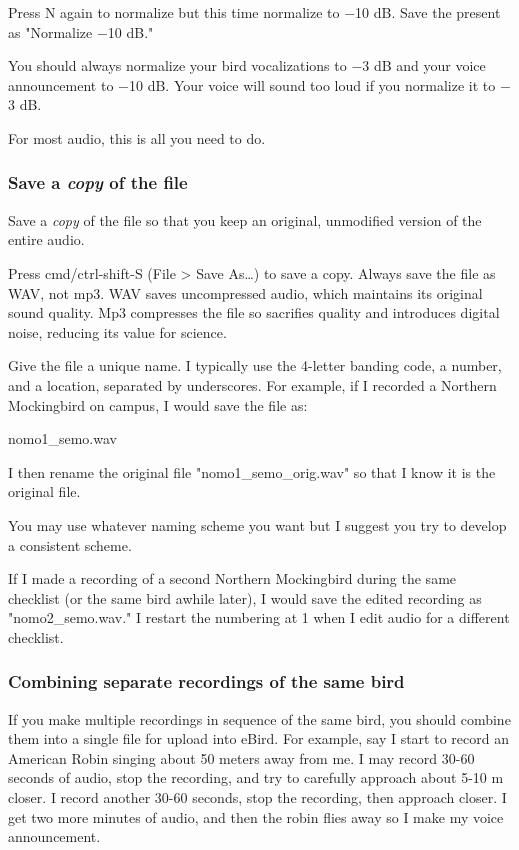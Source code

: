 \documentclass[12pt]{article}
\begin{document}
Press N again to normalize but this time normalize to $-$10 dB. Save the present as "Normalize $-$10 dB."

You should always normalize your bird vocalizations to $-$3 dB and your voice announcement to $-$10 dB. Your voice will sound too loud if you normalize it to $-$3 dB.

For most audio, this is all you need to do. 

\subsubsection*{Save a \emph{copy} of the file}

Save a \emph{copy} of the file so that you keep an original, unmodified version of the entire audio. 

Press cmd/ctrl-shift-S (File > Save As\ldots) to save a copy. Always save the file as WAV, not mp3. WAV saves uncompressed audio, which maintains its original sound quality. Mp3 compresses the file so sacrifies quality and introduces digital noise, reducing its value for science.

Give the file a unique name. I typically use the 4-letter banding code, a number, and a location, separated by underscores.  For example, if I recorded a Northern Mockingbird on campus, I would save the file as:

nomo1\_semo.wav

I then rename the original file "nomo1\_semo\_orig.wav" so that I know it is the original file.  

You may use whatever naming scheme you want but I suggest you try to develop a consistent scheme.

If I made a recording of a second Northern Mockingbird during the same checklist (or the same bird awhile later), I would save the edited recording as "nomo2\_semo.wav."  I restart the numbering at 1 when I edit audio for a different checklist.

\subsubsection*{Combining separate recordings of the same bird}

If you make multiple recordings in sequence of the same bird, you should combine them into a single file for upload into eBird. For example, say I start to record an American Robin singing about 50 meters away from me. I may record 30-60 seconds of audio, stop the recording, and try to carefully approach about 5-10 m closer. I record another 30-60 seconds, stop the recording, then approach closer. I get two more minutes of audio, and then the robin flies away so I make my voice announcement.
\end{document}
